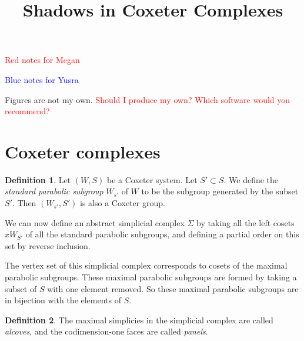 \documentclass[11pt]{article}
\begin{document}
\newtheorem{theorem}{Theorem}
\theoremstyle{definition}
\newtheorem{definition}{Definition}
\newtheorem{proposition}{Proposition}
\newtheorem{example}{Example}
\newtheorem{lemma}{Lemma}
\newtheorem{corollary}{Corollary}
\newcommand{\uw}{\mathcal{U}(W,X)}
\newcommand{\W}{$(W,S)$}
\newcommand{\ix}{\textit}
\newcommand{\tr}{\textcolor{red}}
\newcommand{\sg}{$\Sigma$}


\title{Shadows in Coxeter Complexes}
\maketitle
\tableofcontents 



\textcolor{red}{Red notes for Megan}

\textcolor{blue}{Blue notes for Yusra}

Figures are not my own. \tr{Should I produce my own? Which software would you recommend?}

\section{Coxeter complexes}
\begin{definition}
    Let $(W,S)$ be a Coxeter system. Let $S'\subset S$. We define the \textit{standard parabolic subgroup} $W_{s'}$ of $W$ to be the subgroup generated by the subset $S'$. Then $(W_{s'},S')$ is also a Coxeter group. 
\end{definition}

We can now define an abstract simplicial complex $\Sigma$ by taking all the left cosets $xW_{S'}$ of all the standard parabolic subgroups, and defining a partial order on this set by reverse inclusion. 


The vertex set of this simplicial complex corresponds to cosets of the maximal parabolic subgroups. These maximal parabolic subgroups are formed by taking a subset of $S$ with one element removed. So these maximal parabolic subgroups are in bijection with the elements of $S$. 


\begin{definition}
    The maximal simplicies in the simplicial complex are called \textit{alcoves}, and the codimension-one faces are called \textit{panels}.  
\end{definition}
\end{document}
